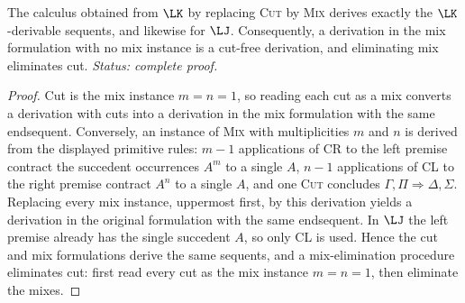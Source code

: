 \begin{lemma}
\label{lem:cut-mix-equipollence}
The calculus obtained from \(\LK\) by replacing \textup{\textsc{Cut}} by
\textup{\textsc{Mix}} derives exactly the \(\LK\)-derivable sequents, and likewise
for \(\LJ\).  Consequently, a derivation in the mix formulation with no
mix instance is a cut-free derivation, and eliminating mix eliminates
cut.
\textit{Status: complete proof.}
\end{lemma}
\begin{proof}
Cut is the mix instance \(m=n=1\), so reading each cut as a mix converts
a derivation with cuts into a derivation in the mix formulation with the
same endsequent.  Conversely, an instance of \textsc{Mix} with
multiplicities \(m\) and \(n\) is derived from the displayed primitive
rules: \(m-1\) applications of \textsc{CR} to the left premise contract
the succedent occurrences \(A^{m}\) to a single \(A\), \(n-1\)
applications of \textsc{CL} to the right premise contract \(A^{n}\) to a
single \(A\), and one \textsc{Cut} concludes
\(\Gamma,\Pi\Rightarrow\Delta,\Sigma\).  Replacing every mix instance,
uppermost first, by this derivation yields a derivation in the original
formulation with the same endsequent.  In \(\LJ\) the left premise
already has the single succedent \(A\), so only \textsc{CL} is used.
Hence the cut and mix formulations derive the same sequents, and a
mix-elimination procedure eliminates cut: first read every cut as the mix
instance \(m=n=1\), then eliminate the mixes.
\end{proof}

